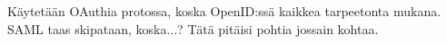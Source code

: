 Käytetään OAuthia protossa, koska OpenID:ssä kaikkea tarpeetonta mukana. SAML taas skipataan, koska...? Tätä pitäisi pohtia jossain kohtaa.